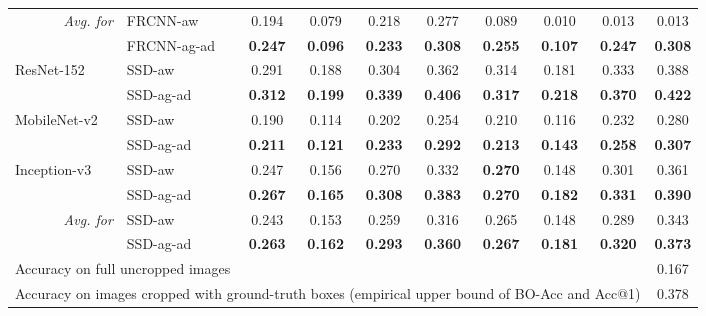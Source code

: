 \documentclass[10pt,twocolumn,letterpaper]{article}
\begin{document}
\begin{table*}
\begin{tabular}{l l c c c c c c c c}
\cmidrule[0.5pt](r){1-2} \cmidrule[0.5pt](lr){3-6} \cmidrule[0.5pt](lr){7-10}
\multicolumn{1}{r}{\multirow{2}{*}{\textit{Avg. for}}} & FRCNN-aw & 0.194 & 0.079 & 0.218 & 0.277 & 0.089 & 0.010 & 0.013 & 0.013 \\
    \multicolumn{1}{r}{} & FRCNN-ag-ad & \textbf{0.247} & \textbf{0.096} & \textbf{0.233} & \textbf{0.308} & \textbf{0.255} & \textbf{0.107} & \textbf{0.247} & \textbf{0.308} \\ \cmidrule[0.6pt]{1-10}
 \multirow{2}{*}{ResNet-152} & SSD-aw & 0.291 & 0.188 & 0.304 & 0.362 & 0.314 & 0.181 & 0.333 & 0.388 \\
 & SSD-ag-ad & \textbf{0.312} & \textbf{0.199} & \textbf{0.339} & \textbf{0.406} & \textbf{0.317} & \textbf{0.218} & \textbf{0.370} & \textbf{0.422} \\
 \cmidrule[0.1pt](r){1-2} \cmidrule[0.1pt](lr){3-6} \cmidrule[0.1pt](lr){7-10}
  \multirow{2}{*}{MobileNet-v2} & SSD-aw & 0.190 & 0.114 & 0.202 & 0.254 & 0.210 & 0.116 & 0.232 & 0.280 \\
    & SSD-ag-ad & \textbf{0.211} & \textbf{0.121} & \textbf{0.233} & \textbf{0.292} & \textbf{0.213} & \textbf{0.143} & \textbf{0.258} & \textbf{0.307} \\
\cmidrule[0.1pt](r){1-2} \cmidrule[0.1pt](lr){3-6} \cmidrule[0.1pt](lr){7-10}
  \multirow{2}{*}{Inception-v3} & SSD-aw & 0.247 & 0.156 & 0.270 & 0.332 & \textbf{0.270} & 0.148 & 0.301 & 0.361 \\
    & SSD-ag-ad & \textbf{0.267} & \textbf{0.165} & \textbf{0.308} & \textbf{0.383} & \textbf{0.270} & \textbf{0.182} & \textbf{0.331} & \textbf{0.390} \\
\cmidrule[0.5pt](r){1-2} \cmidrule[0.5pt](lr){3-6} \cmidrule[0.5pt](lr){7-10}
  \multicolumn{1}{r}{\multirow{2}{*}{\textit{Avg. for}}} & SSD-aw & 0.243 & 0.153 & 0.259 & 0.316 & 0.265 & 0.148 & 0.289 & 0.343 \\
   \multicolumn{1}{r}{} & SSD-ag-ad & \textbf{0.263} & \textbf{0.162} & \textbf{0.293} & \textbf{0.360} & \textbf{0.267} & \textbf{0.181} & \textbf{0.320} & \textbf{0.373} \\ \cmidrule[0.75pt]{1-10}
 \multicolumn{9}{l}{Accuracy on full uncropped images} & 0.167\\
 \multicolumn{9}{l}{Accuracy on images cropped with ground-truth boxes (empirical upper bound of BO-Acc and Acc@1)} & 0.378 \\
 \bottomrule
\end{tabular}
\vspace{-5pt}
\end{table*}
\end{document}
